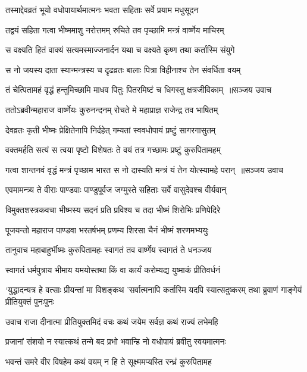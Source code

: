 \twolineshloka
{तस्माद्देवव्रतं भूयो वधोपायार्थमात्मनः}
{भवता सहिताः सर्वे प्रयाम मधुसूदन}


\twolineshloka
{तद्वयं सहिता गत्वा भीष्ममाशु नरोत्तमम्}
{रुचिते तव पृच्छामि मन्त्रं वार्ष्णेय माचिरम्}


\twolineshloka
{स वक्ष्यति हितं वाक्यं सत्यमस्माज्जनार्दन}
{यथा च वक्ष्यते कृष्ण तथा कर्तास्मि संयुगे}


\twolineshloka
{स नो जयस्य दाता स्यान्मन्त्रस्य च दृढव्रतः}
{बालाः पित्रा विहीनाश्च तेन संवर्धिता वयम्}


\threelineshloka
{तं चेत्पितामहं वृद्धं हन्तुमिच्छामि माधव}
{पितुः पितरमिष्टं च धिगस्तु क्षत्रजीविकाम् ॥सञ्जय उवाच}
{}


\twolineshloka
{ततोऽब्रवीन्महाराज वार्ष्णेयः कुरुनन्दनम्}
{रोचते मे महाप्राज्ञ राजेन्द्र तव भाषितम्}


\twolineshloka
{देवव्रतः कृती भीष्मः प्रेक्षितेनापि निर्दहेत्}
{गम्यतां स्ववधोपायं प्रष्टुं सागरगासुतम्}


\twolineshloka
{वक्तमर्हति सत्यं स त्वया पृष्टो विशेषतः}
{ते वयं तत्र गच्छामः प्रष्टुं कुरुपितामहम्}


\threelineshloka
{गत्वा शान्तनवं वृद्धं मन्त्रं पृच्छाम भारत}
{स नो दास्यति मन्त्रं यं तेन योत्स्यामहे परान् ॥सञ्जय उवाच}
{}


\twolineshloka
{एवमामन्त्र्य ते वीराः पाण्डवाः पाण्डुपूर्वज}
{जग्मुस्ते सहिताः सर्वे वासुदेवश्च वीर्यवान्}


\twolineshloka
{विमुक्तशस्त्रकवचा भीष्मस्य सदनं प्रति}
{प्रविश्य च तदा भीष्मं शिरोभिः प्रणिपेदिरे}


\twolineshloka
{पूजयन्तो महाराज पाण्डवा भरतर्षभम्}
{प्रणम्य शिरसा चैनं भीष्मं शरणमभ्ययुः}


\twolineshloka
{तानुवाच महाबाहुर्भीष्मः कुरुपितामहः}
{स्वागतं तव वार्ष्णेय स्वागतं ते धनञ्जय}


\twolineshloka
{स्वागतं धर्मपुत्राय भीमाय यमयोस्तथा}
{किं वा कार्यं करोम्यद्य युष्माकं प्रीतिवर्धनं}


\threelineshloka
{`युद्धादन्यत्र हे वत्साः प्रीयन्तां मा विशङ्कथ}
{'सर्वात्मनापि कर्तास्मि यदपि स्यात्सदुष्करम्}
{तथा ब्रुवाणं गाङ्गेयं प्रीतियुक्तं पुनःपुनः}


\twolineshloka
{उवाच राजा दीनात्मा प्रीतियुक्तमिदं वचः}
{कथं जयेम सर्वज्ञ कथं राज्यं लभेमहि}


\twolineshloka
{प्रजानां संशयो न स्यात्कथं तन्मे बद प्रभो}
{भवान्हि नो वधोपायं ब्रवीतु स्वयमात्मनः}


\twolineshloka
{भवन्तं समरे वीर विषहेम कथं वयम्}
{न हि ते सूक्ष्ममप्यस्ति रन्ध्रं कुरुपितामह}


